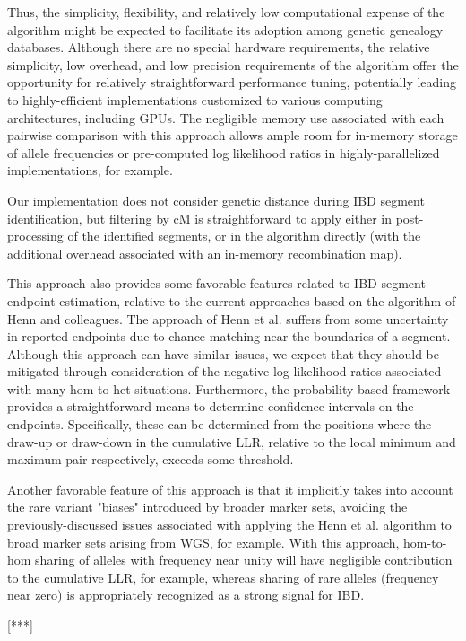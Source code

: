 \documentclass{article}
\begin{document}
Thus, the simplicity, flexibility, and relatively low computational expense of the algorithm might be expected to facilitate its adoption among genetic genealogy databases. Although there are no special hardware requirements, the relative simplicity, low overhead, and low precision requirements of the algorithm offer the opportunity for relatively straightforward performance tuning, potentially leading to highly-efficient implementations customized to various computing architectures, including GPUs. The negligible memory use associated with each pairwise comparison with this approach allows ample room for in-memory storage of allele frequencies or pre-computed log likelihood ratios in highly-parallelized implementations, for example.

Our implementation does not consider genetic distance during IBD segment identification, but filtering by cM is straightforward to apply either in post-processing of the identified segments, or in the algorithm directly (with the additional overhead associated with an in-memory recombination map).

This approach also provides some favorable features related to IBD segment endpoint estimation, relative to the current approaches based on the algorithm of Henn and colleagues. The approach of Henn et al. suffers from some uncertainty in reported endpoints due to chance matching near the boundaries of a segment. Although this approach can have similar issues, we expect that they should be mitigated through consideration of the negative log likelihood ratios associated with many hom-to-het situations. Furthermore, the probability-based framework provides a straightforward means to determine confidence intervals on the endpoints. Specifically, these can be determined from the positions where the draw-up or draw-down in the cumulative LLR, relative to the local minimum and maximum pair respectively, exceeds some threshold.

Another favorable feature of this approach is that it implicitly takes into account the rare variant "biases" introduced by broader marker sets, avoiding the previously-discussed issues associated with applying the Henn et al. algorithm to broad marker sets arising from WGS, for example. With this approach, hom-to-hom sharing of alleles with frequency near unity will have negligible contribution to the cumulative LLR, for example, whereas sharing of rare alleles (frequency near zero) is appropriately recognized as a strong signal for IBD.

[***]
\end{document}
